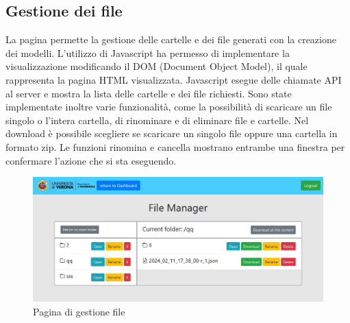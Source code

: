 \newpage
\subsection{Gestione dei file}
\label{secsub:flask-funzionalità-file}
La pagina permette la gestione delle cartelle e dei file generati con la creazione dei modelli.
L'utilizzo di Javascript ha permesso di implementare la visualizzazione modificando il DOM (Document Object Model),
il quale rappresenta la pagina HTML visualizzata.
Javascript esegue delle chiamate API al server e mostra la lista delle cartelle e dei file richiesti.
Sono state implementate inoltre varie funzionalità, come la possibilità di scaricare un file singolo o l'intera cartella, 
di rinominare e di eliminare file e cartelle.
Nel download è possibile scegliere se scaricare un singolo file oppure una cartella in formato zip.
Le funzioni rinomina e cancella mostrano entrambe una finestra per confermare l'azione che si sta eseguendo.
\begin{figure}[htp]
    \centering
    \includegraphics[width=0.85\linewidth]{images/chapter4-flask-file_manager.jpg}
    \caption{Pagina di gestione file}
\end{figure}

